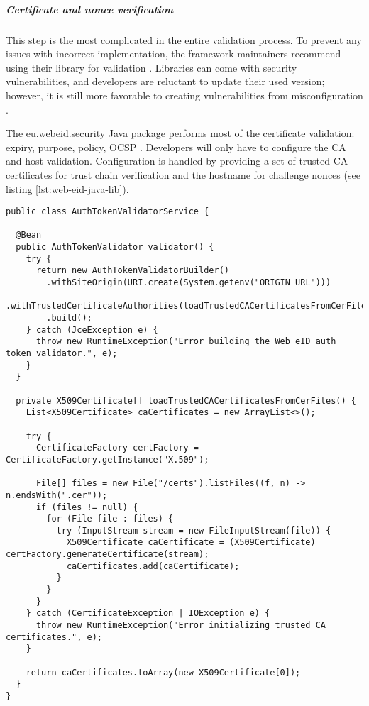 \subparagraph{Certificate and nonce verification}

This step is the most complicated in the entire validation process. To prevent any issues with incorrect implementation, the framework maintainers recommend using their library for validation \cite{ria-webeid-source-web-eid-authtoken-validation-java-readme}. Libraries can come with security vulnerabilities, and developers are reluctant to update their used version; however, it is still more favorable to creating vulnerabilities from misconfiguration \cite{9240619}.

The eu.webeid.security Java package performs most of the certificate validation: expiry, purpose, policy, OCSP \cite{ria-webeid-source-web-eid-authtoken-validation-java-readme}. Developers will only have to configure the CA and host validation. Configuration is handled by providing a set of trusted CA certificates for trust chain verification and the hostname for challenge nonces (see listing \ref{lst:web-eid-java-lib}).


\begin{lstlisting}[caption={Web eID Login Endpoint}, label={lst:web-eid-java-lib}]
public class AuthTokenValidatorService {

  @Bean
  public AuthTokenValidator validator() {
    try {
      return new AuthTokenValidatorBuilder()
        .withSiteOrigin(URI.create(System.getenv("ORIGIN_URL")))
        .withTrustedCertificateAuthorities(loadTrustedCACertificatesFromCerFiles())
        .build();
    } catch (JceException e) {
      throw new RuntimeException("Error building the Web eID auth token validator.", e);
    }
  }

  private X509Certificate[] loadTrustedCACertificatesFromCerFiles() {
    List<X509Certificate> caCertificates = new ArrayList<>();

    try {
      CertificateFactory certFactory = CertificateFactory.getInstance("X.509");

      File[] files = new File("/certs").listFiles((f, n) -> n.endsWith(".cer"));
      if (files != null) {
        for (File file : files) {
          try (InputStream stream = new FileInputStream(file)) {
            X509Certificate caCertificate = (X509Certificate) certFactory.generateCertificate(stream);
            caCertificates.add(caCertificate);
          }
        }
      }
    } catch (CertificateException | IOException e) {
      throw new RuntimeException("Error initializing trusted CA certificates.", e);
    }

    return caCertificates.toArray(new X509Certificate[0]);
  }
}
\end{lstlisting}

